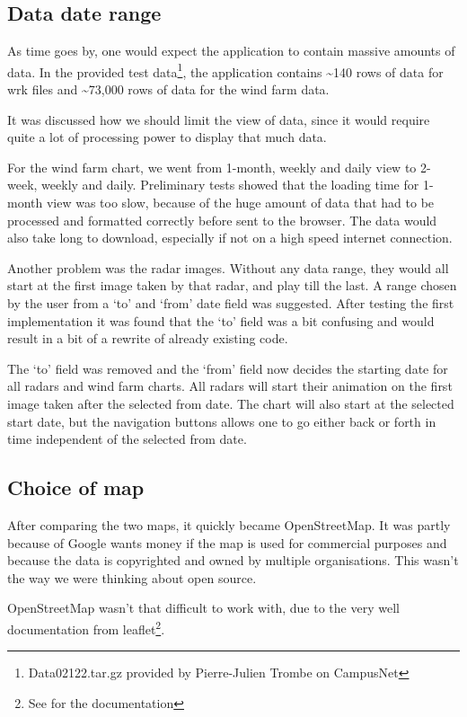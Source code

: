 \subsection{Data date range}
As time goes by, one would expect the application to contain massive amounts of data.
In the provided test data\footnote{Data02122.tar.gz provided by Pierre-Julien Trombe on CampusNet}, the application contains \textasciitilde 140 rows of data for \textsf{wrk} files and \textasciitilde 73,000 rows of data for the wind farm data.

It was discussed how we should limit the view of data, since it would require quite a lot of processing power to display that much data.

For the wind farm chart, we went from 1-month, weekly and daily view to 2-week, weekly and daily.
Preliminary tests showed that the loading time for 1-month view was too slow, because of the huge amount of data that had to be processed and formatted correctly before sent to the browser. The data would also take long to download, especially if not on a high speed internet connection.

Another problem was the radar images. Without any data range, they would all start at the first image taken by that radar, and play till the last. A range chosen by the user from a `to' and `from' date field was suggested. After testing the first implementation it was found that the `to' field was a bit confusing and would result in a bit of a rewrite of already existing code.

The `to' field was removed and the `from' field now decides the starting date for all radars and wind farm charts.
All radars will start their animation on the first image taken after the selected from date.
The chart will also start at the selected start date, but the navigation buttons allows one to go either back or forth in time independent of the selected from date.

\subsection{Choice of map}
After comparing the two maps, it quickly became OpenStreetMap. It was partly because of Google wants money if the map is used for commercial purposes and because the data is copyrighted and owned by multiple organisations. This wasn't the way we were thinking about open source.

OpenStreetMap wasn't that difficult to work with, due to the very well documentation from leaflet\footnote{See \cite{leaflet} for the documentation}.

